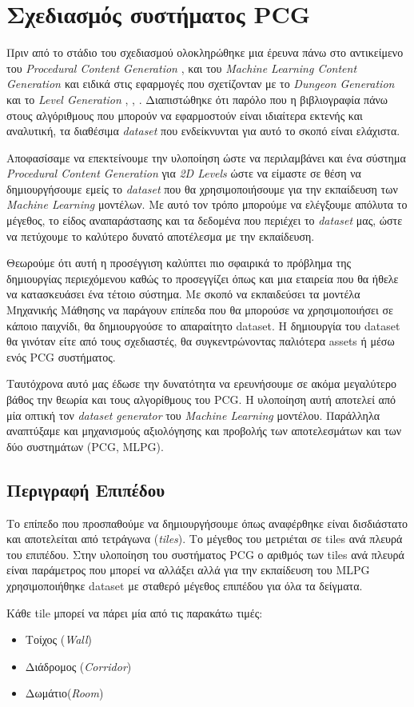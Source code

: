 \section{Σχεδιασμός συστήματος PCG}
Πριν από το στάδιο του σχεδιασμού ολοκληρώθηκε μια έρευνα πάνω στο αντικείμενο του \textit{Procedural Content Generation} \cite{answersetforpcg} \cite{constrainedsearchpcg} \cite{surrogate}, \cite{roguedream} και του  \textit{Machine Learning Content Generation \cite{mlpcg}} και ειδικά στις εφαρμογές που σχετίζονταν με το \textit{Dungeon Generation} και το \textit{Level Generation} \cite{cellular}, \cite{missions}, \cite{platform}. Διαπιστώθηκε ότι παρόλο που η βιβλιογραφία πάνω στους αλγόριθμους που μπορούν να εφαρμοστούν είναι ιδιαίτερα εκτενής και αναλυτική, τα διαθέσιμα \textit{dataset} που ενδείκνυνται για αυτό το σκοπό είναι ελάχιστα.
\par
Αποφασίσαμε να επεκτείνουμε την υλοποίηση ώστε να περιλαμβάνει και ένα σύστημα \textit{Procedural Content Generation} για \textit{2D Levels} ώστε να είμαστε σε θέση να δημιουργήσουμε εμείς το \textit{dataset} που θα χρησιμοποιήσουμε για την εκπαίδευση των \textit{Machine Learning} μοντέλων. Με αυτό τον τρόπο μπορούμε να ελέγξουμε απόλυτα το μέγεθος, το είδος αναπαράστασης και τα δεδομένα που περιέχει το \textit{dataset} μας, ώστε να πετύχουμε το καλύτερο δυνατό αποτέλεσμα με την εκπαίδευση.
\par
Θεωρούμε ότι αυτή η προσέγγιση καλύπτει πιο σφαιρικά το πρόβλημα της δημιουργίας περιεχόμενου καθώς το προσεγγίζει όπως και μια εταιρεία που θα ήθελε να κατασκευάσει ένα τέτοιο σύστημα. Με σκοπό να εκπαιδεύσει τα μοντέλα Μηχανικής Μάθησης να παράγουν επίπεδα που θα μπορούσε να χρησιμοποιήσει σε κάποιο παιχνίδι, θα δημιουργούσε το απαραίτητο dataset. Η δημιουργία του dataset θα γινόταν είτε από τους σχεδιαστές, θα συγκεντρώνοντας παλιότερα assets ή μέσω ενός PCG συστήματος.
\par
Ταυτόχρονα αυτό μας έδωσε την δυνατότητα να ερευνήσουμε σε ακόμα μεγαλύτερο βάθος την θεωρία και τους αλγορίθμους του PCG. Η υλοποίηση αυτή αποτελεί από μία οπτική τον \textit{dataset generator} του \textit{Machine Learning} μοντέλου. Παράλληλα αναπτύξαμε και μηχανισμούς αξιολόγησης και προβολής των αποτελεσμάτων και των δύο συστημάτων (PCG, MLPG).


\subsection{Περιγραφή Επιπέδου}
Το επίπεδο που προσπαθούμε να δημιουργήσουμε όπως αναφέρθηκε είναι δισδιάστατο και αποτελείται από τετράγωνα (\textit{tiles}). Το μέγεθος του μετριέται σε tiles ανά πλευρά του επιπέδου. Στην υλοποίηση του συστήματος PCG ο αριθμός των tiles ανά πλευρά είναι παράμετρος που μπορεί να αλλάξει αλλά για την εκπαίδευση του MLPG χρησιμοποιήθηκε dataset με σταθερό μέγεθος επιπέδου για όλα τα δείγματα.
\par
Κάθε tile μπορεί να πάρει μία από τις παρακάτω τιμές:
\begin{itemize}
\item Τοίχος (\textit{Wall})
\item Διάδρομος (\textit{Corridor})
\item Δωμάτιο(\textit{Room})
\end{itemize}

